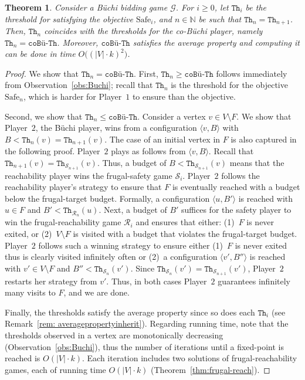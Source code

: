 \documentclass{article}\providecommand{\nequiv}{\not\equiv}\usepackage[a4paper,margin=20mm]{geometry}
\newtheorem{theorem}{Theorem}\newtheorem{lemma}[theorem]{Lemma}\newtheorem{proposition}[theorem]{Proposition}\newtheorem{corollary}[theorem]{Corollary}\newtheorem{definition}[theorem]{Definition}\newtheorem{claim}[theorem]{Claim}\newtheorem{remark}[theorem]{Remark}\newtheorem{observation}[theorem]{Observation}\newtheorem{conjecture}[theorem]{Conjecture}\newtheorem{example}[theorem]{Example}
\newcommand{\PO}{Player~$1$\xspace}
\newcommand{\PT}{Player~$2$\xspace}
\newcommand{\G}{{\mathcal G}}
\newcommand{\R}{{\mathcal R}}
\renewcommand{\S}{{\mathcal S}}
\newcommand{\Nat}{\mathbb{N}}
\newcommand{\notF}{V \setminus F}
\newcommand{\thresh}{\texttt{Th}\xspace}
\newcommand{\coTh}{\texttt{coB\"u-Th}}
\newcommand{\safe}{\text{Safe}}
\newcommand{\coBuchi}{\text{co-B\"uchi}\xspace}
\newcommand{\zug}[1]{\langle #1  \rangle}
\begin{document}
\begin{theorem}
\label{thm:correctness-Buchi}
Consider a B\"uchi bidding game $\G$. For $i \geq 0$, let $\thresh_i$ be the threshold for satisfying the objective $\safe_i$, and $n \in \Nat$ be such that $\thresh_n = \thresh_{n+1}$. Then, $\thresh_n$ coincides with the thresholds for the co-B\"uchi player, namely $\thresh_n = \coTh$. Moreover, $\coTh$ satisfies the average property and computing it can be done in time $O\big((|V| \cdot k)^2\big)$.
\end{theorem}
\begin{proof}
We show that $\thresh_n = \coTh$. First, $\thresh_n \geq \coTh$ follows immediately from Observation~\ref{obs:Buchi}; recall that $\thresh_n$ is the threshold for the objective $\safe_n$,  which is harder for \PO to ensure than the \coBuchi objective. 

Second, we show that $\thresh_n \leq \coTh$. 
Consider a vertex $v \in \notF$. We show that \PT, the B\"uchi player, wins from a configuration $\zug{v, B}$ with $B < \thresh_n(v) = \thresh_{n+1}(v)$. The case of an initial vertex in $F$ is also captured in the following proof. \PT plays as follows from $\zug{v, B}$. Recall that $\thresh_{n+1}(v) = \thresh_{\S_{n+1}}(v)$. Thus, a budget of $B < \thresh_{\S_{n+1}}(v)$ means that the reachability player wins the frugal-safety game $\S_i$. \PT follows the reachability player's strategy to ensure that $F$ is eventually reached with a budget below the frugal-target budget. Formally, a configuration $\zug{u, B'}$ is reached with $u \in F$ and $B' < \thresh_{\R_{n}}(u)$. Next, a budget of $B'$ suffices for the safety player to win the frugal-reachability game $\R_i$ and ensures that either: (1)~$F$ is never exited, or (2)~$\notF$ is visited with a budget that violates the frugal-target budget. \PT follows such a winning strategy to ensure either (1)~$F$ is never exited thus is clearly visited infinitely often or (2)~a configuration $\zug{v', B''}$ is reached with $v' \in \notF$ and $B'' < \thresh_{\S_{n}}(v')$. Since $\thresh_{\S_{n}}(v') = \thresh_{\S_{n+1}}(v')$, \PT restarts her strategy from $v'$. Thus, in both cases \PT guarantees infinitely many visits to $F$, and we are done. 

Finally, the thresholds satisfy the average property since so does each \(\thresh_i\) (see Remark~\ref{rem: averagepropertyinherit}). 
Regarding running time, note that the thresholds observed in a vertex are monotonically decreasing (Observation~\ref{obs:Buchi}), thus the number of iterations until a fixed-point is reached is $O(|V| \cdot k)$. Each iteration includes two solutions of frugal-reachability games, each of running time $O(|V| \cdot k)$ (Theorem~\ref{thm:frugal-reach}). 
\end{proof}
\end{document}
